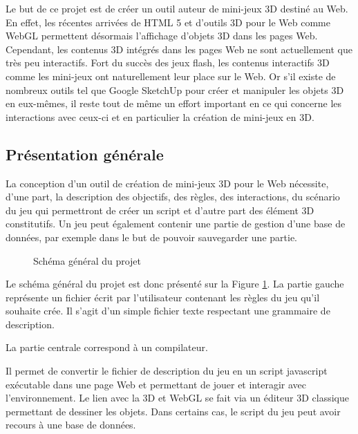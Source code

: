 Le but de ce projet est de créer un outil auteur de mini-jeux 3D destiné au Web.
En effet, les récentes arrivées de HTML 5 et d'outils 3D pour le Web comme WebGL permettent désormais l'affichage d'objets 3D dans les pages Web.
Cependant, les contenus 3D intégrés dans les pages Web ne sont actuellement que très peu interactifs.
Fort du succès des jeux flash, les contenus interactifs 3D comme les mini-jeux ont naturellement leur place sur le Web.
Or s'il existe de nombreux outils tel que Google SketchUp pour créer et manipuler les objets 3D en eux-mêmes,
il reste tout de même un effort important en ce qui concerne les interactions avec ceux-ci et en particulier la création de mini-jeux en 3D.

\subsection{Présentation générale}

La conception d'un outil de création de mini-jeux 3D pour le Web nécessite, d'une part, la description des objectifs, des règles, des interactions, 
du scénario du jeu qui permettront de créer un script et d'autre part des élément 3D constitutifs. Un jeu peut également contenir
une partie de gestion d'une base de données, par exemple dans le but de pouvoir sauvegarder une partie.

\begin{figure}[h]
 \caption{Schéma général du projet}
 \label{fig:schemaprojet}
\end{figure}

Le schéma général du projet est donc présenté sur la Figure \ref{fig:schemaprojet}.
La partie gauche représente un fichier écrit par l'utilisateur contenant les règles du jeu qu'il souhaite crée.
Il s'agit d'un simple fichier texte respectant une grammaire de description.

La partie centrale correspond à un compilateur.

Il permet de convertir le fichier de description du jeu en un script javascript exécutable dans une page Web et permettant de jouer et 
interagir avec l'environnement.
Le lien avec la 3D et WebGL se fait via un éditeur 3D classique permettant de dessiner les objets.
Dans certains cas, le script du jeu peut avoir recours à une base de données.

